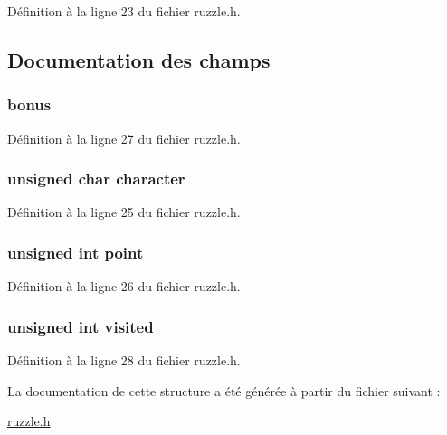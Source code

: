 Définition à la ligne 23 du fichier ruzzle.\+h.



\subsection{Documentation des champs}
\hypertarget{structcell_a1724452b0364c62e84a310b3c29e80bc}{}
\subsubsection[{bonus}]{ bonus}\label{structcell_a1724452b0364c62e84a310b3c29e80bc}


Définition à la ligne 27 du fichier ruzzle.\+h.

\hypertarget{structcell_abe31bdd62e498dce604b14e75df142dd}{}
\subsubsection[{character}]{\setlength{\rightskip}{0pt plus 5cm}unsigned char character}\label{structcell_abe31bdd62e498dce604b14e75df142dd}


Définition à la ligne 25 du fichier ruzzle.\+h.

\hypertarget{structcell_a914cae0a595952eda16c33e4ca9c1cbb}{}
\subsubsection[{point}]{\setlength{\rightskip}{0pt plus 5cm}unsigned int point}\label{structcell_a914cae0a595952eda16c33e4ca9c1cbb}


Définition à la ligne 26 du fichier ruzzle.\+h.

\hypertarget{structcell_ac5ab8c056a470676e0b6689ffdda1a05}{}
\subsubsection[{visited}]{\setlength{\rightskip}{0pt plus 5cm}unsigned int visited}\label{structcell_ac5ab8c056a470676e0b6689ffdda1a05}


Définition à la ligne 28 du fichier ruzzle.\+h.



La documentation de cette structure a été générée à partir du fichier suivant \+:\begin{DoxyCompactItemize}
\item 
\hyperlink{ruzzle_8h}{ruzzle.\+h}\end{DoxyCompactItemize}
